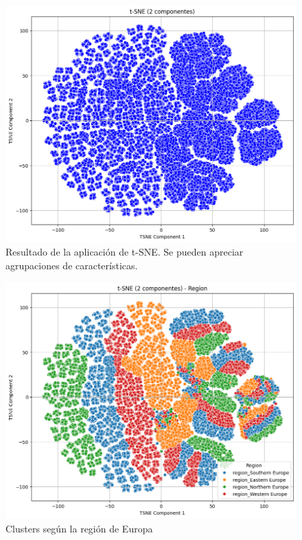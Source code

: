 \documentclass[10pt,journal,compsoc]{IEEEtran}
\begin{document}
\begin{figure}[htb]
    \centering
    \includegraphics[width=\linewidth]{imagenes/tsne.png}
    \caption{Resultado de la aplicación de t-SNE. Se pueden apreciar agrupaciones de características.}
    \label{fig:tsne}
\end{figure}

\begin{figure}[htb]
    \centering
    \includegraphics[width=\linewidth]{imagenes/region.png}
    \caption{Clusters según la región de Europa}
    \label{fig:tsne_region}
\end{figure}
\end{document}
